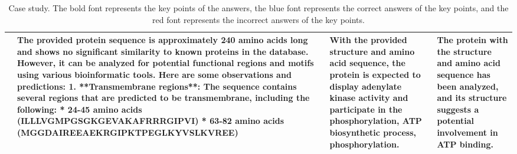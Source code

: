 \begin{table*}[t]
\begin{tabular}{m{}|m{}|m{}|m{}}
\begin{minipage}[c][0.01\textwidth][c]{0.2\textwidth}
        \end{minipage}  &The provided protein sequence is approximately 240 amino acids long and shows no significant similarity to known proteins in the database. However, it can be analyzed for potential functional regions and motifs using various bioinformatic tools. Here are some observations and predictions: 1. \color{red}**Transmembrane regions**\color{black}: The sequence contains several regions that are \color{red}predicted to be transmembrane,\color{black} including the following: * 24-45 amino acids (ILLLVGMPGSGKGEVAKAFRRRGIPVI) * 63-82 amino acids (MGGDAIREEAEKRGIPKTPEGLKYVSLKVREE) & With the provided structure and amino acid sequence, the protein is expected to \color{blue}display adenylate kinase activity and participate in the phosphorylation, ATP biosynthetic process, phosphorylation. & The protein with the structure and amino acid sequence has been analyzed, and its structure suggests a potential \textbf{involvement in ATP binding}.\\
        \hline
    \end{tabular}
    \caption{Case study. The bold font represents the key points of the answers, the blue font represents the correct answers of the key points, and the red font represents the incorrect answers of the key points.}
    \label{tab:example}
\end{table*}